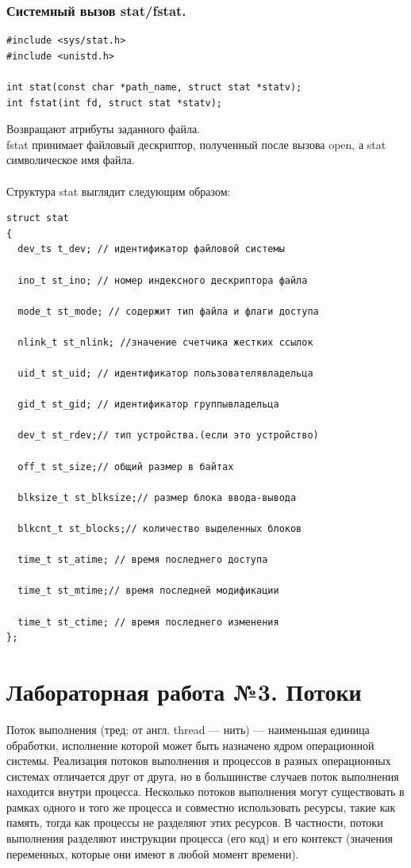 \documentclass[a4paper]{article}
\begin{document}
\subsubsection{\Large Системный вызов stat/fstat.}
\begin{verbatim}
#include <sys/stat.h>
#include <unistd.h>

int stat(const char *path_name, struct stat *statv);
int fstat(int fd, struct stat *statv);
\end{verbatim}
Возвращают атрибуты заданного файла. \\
fstat принимает файловый дескриптор, полученный после вызова open, а stat символическое имя файла.\\\\
Структура stat выглядит следующим образом:
\begin{verbatim}
struct stat
{
  dev_ts t_dev; // идентификатор файловой системы

  ino_t st_ino; // номер индексного дескриптора файла

  mode_t st_mode; // содержит тип файла и флаги доступа

  nlink_t st_nlink; //значение счетчика жестких ссылок

  uid_t st_uid; // идентификатор пользователявладельца

  gid_t st_gid; // идентификатор группывладельца

  dev_t st_rdev;// тип устройства.(если это устройство)

  off_t st_size;// общий размер в байтах

  blksize_t st_blksize;// размер блока ввода-вывода

  blkcnt_t st_blocks;// количество выделенных блоков

  time_t st_atime; // время последнего доступа

  time_t st_mtime;// время последней модификации

  time_t st_ctime; // время последнего изменения
};
\end{verbatim}

\newpage
\section{\bf Лабораторная работа №3. Потоки}
Поток выполнения (тред; от англ. thread — нить) — наименьшая единица обработки, исполнение которой может быть назначено ядром операционной системы. Реализация потоков выполнения и процессов в разных операционных системах отличается друг от друга, но в большинстве случаев поток выполнения находится внутри процесса. Несколько потоков выполнения могут существовать в рамках одного и того же процесса и совместно использовать ресурсы, такие как память, тогда как процессы не разделяют этих ресурсов. В частности, потоки выполнения разделяют инструкции процесса (его код) и его контекст (значения переменных, которые они имеют в любой момент времени).
\end{document}
